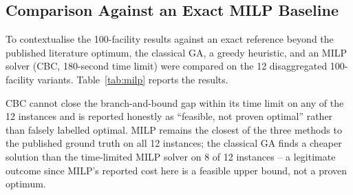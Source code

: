 \documentclass[conference]{IEEEtran}
\begin{document}
\subsection{Comparison Against an Exact MILP Baseline}

To contextualise the 100-facility results against an exact reference beyond
the published literature optimum, the classical GA, a greedy heuristic, and an
MILP solver (CBC, 180-second time limit) were compared on the 12
disaggregated 100-facility variants. Table~\ref{tab:milp} reports the
results.

\begin{table}[t]
\centering
\caption{MILP, Greedy, and Classical GA on the 100-facility variants. MILP gap is vs.\ published ground truth; Greedy/GA gaps are vs.\ the time-limited MILP cost (negative = beat MILP within its time limit).}
\label{tab:milp}
\end{table}

CBC cannot close the branch-and-bound gap within its time limit on any of the
12 instances and is reported honestly as ``feasible, not proven optimal''
rather than falsely labelled optimal. MILP remains the closest of the three
methods to the published ground truth on all 12 instances; the classical GA
finds a cheaper solution than the time-limited MILP solver on 8 of 12
instances -- a legitimate outcome since MILP's reported cost here is a
feasible upper bound, not a proven optimum.
\end{document}
